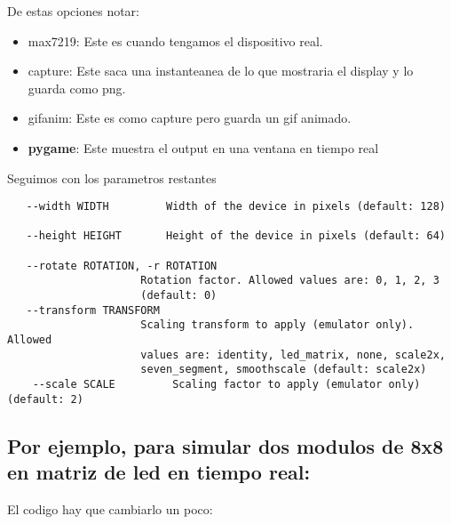 De estas opciones notar:

\begin{itemize}
\itemsep1pt\parskip0pt
\item
  max7219: Este es cuando tengamos el dispositivo real.\\
\item
  capture: Este saca una instanteanea de lo que mostraria el display y
  lo guarda como png.\\
\item
  gifanim: Este es como capture pero guarda un gif animado.\\
\item
  \textbf{pygame}: Este muestra el output en una ventana en tiempo real
\end{itemize}

Seguimos con los parametros restantes

\begin{verbatim}
   --width WIDTH         Width of the device in pixels (default: 128)
   
   --height HEIGHT       Height of the device in pixels (default: 64)
   
   --rotate ROTATION, -r ROTATION
                     Rotation factor. Allowed values are: 0, 1, 2, 3
                     (default: 0)
   --transform TRANSFORM
                     Scaling transform to apply (emulator only). Allowed
                     values are: identity, led_matrix, none, scale2x,
                     seven_segment, smoothscale (default: scale2x)
    --scale SCALE         Scaling factor to apply (emulator only) (default: 2)
\end{verbatim}

\subsection{Por ejemplo, para simular dos modulos de 8x8 en matriz de
led en tiempo
real:}\label{por-ejemplo-para-simular-dos-modulos-de-8x8-en-matriz-de-led-en-tiempo-real}

El codigo hay que cambiarlo un poco:

